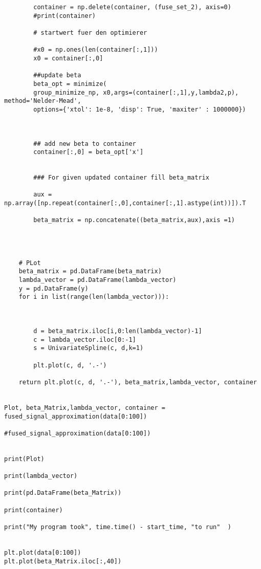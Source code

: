 \documentclass{article}
\theoremstyle{definition}
\begin{document}
\begin{lstlisting}
        container = np.delete(container, (fuse_set_2), axis=0)
        #print(container)
        
        # startwert fuer den optimierer
        
        #x0 = np.ones(len(container[:,1]))
        x0 = container[:,0]
        
        ##update beta
        beta_opt = minimize(
        group_minimize_np, x0,args=(container[:,1],y,lambda2,p), method='Nelder-Mead', 
        options={'xtol': 1e-8, 'disp': True, 'maxiter' : 1000000}) 
        
        
       
        ## add new beta to container
        container[:,0] = beta_opt['x']
        
        
        ### For given updated container fill beta_matrix
        
        aux = np.array([np.repeat(container[:,0],container[:,1].astype(int))]).T
        
        beta_matrix = np.concatenate((beta_matrix,aux),axis =1)
        
        

    
    # PLot 
    beta_matrix = pd.DataFrame(beta_matrix)
    lambda_vector = pd.DataFrame(lambda_vector)
    y = pd.DataFrame(y)
    for i in list(range(len(lambda_vector))):
        
        
        
        d = beta_matrix.iloc[i,0:len(lambda_vector)-1]
        c = lambda_vector.iloc[0:-1]
        s = UnivariateSpline(c, d,k=1)
        
        plt.plot(c, d, '.-')
        
    return plt.plot(c, d, '.-'), beta_matrix,lambda_vector, container
        
      
Plot, beta_Matrix,lambda_vector, container = fused_signal_approximation(data[0:100])

#fused_signal_approximation(data[0:100])


print(Plot)      
 
print(lambda_vector)

print(pd.DataFrame(beta_Matrix))

print(container)   
                                                            
print("My program took", time.time() - start_time, "to run"  )  


plt.plot(data[0:100])
plt.plot(beta_Matrix.iloc[:,40])
\end{lstlisting}
\end{document}
